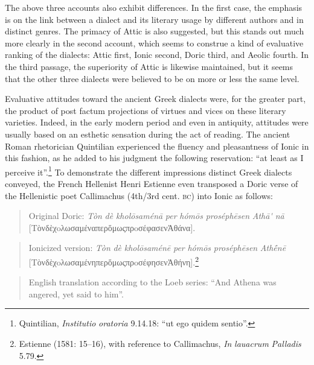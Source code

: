 The above three accounts also exhibit differences. In the first case, the emphasis is on the link between a dialect and its literary usage by different authors and in distinct genres. The primacy of Attic is also suggested, but this stands out much more clearly in the second account, which seems to construe a kind of evaluative ranking of the dialects: Attic first, Ionic second, Doric third, and Aeolic fourth. In the third passage, the superiority of Attic is likewise maintained, but it seems that the other three dialects were believed to be on more or less the same level.

Evaluative attitudes toward the ancient Greek dialects were, for the greater part, the product of post factum projections of virtues and vices on these literary varieties. Indeed, in the early modern period and even in antiquity, attitudes were usually based on an esthetic sensation during the act of reading. The ancient Roman rhetorician Quintilian experienced the fluency and pleasantness of Ionic in this fashion, as he added to his judgment the following reservation: “at least as I perceive it”.\footnote{Quintilian, \textit{Institutio} \textit{oratoria} 9.14.18: “ut ego quidem sentio”.} To demonstrate the different impressions distinct Greek dialects conveyed, the French Hellenist Henri Estienne even transposed a Doric verse of the Hellenistic poet Callimachus (4th/3rd cent. \textsc{bc}) into Ionic as follows:

\begin{quote}
Original Doric: \textit{Tòn} \textit{dè} \textit{kholōsaménā} \textit{per} \textit{hómōs} \textit{proséphēsen} \textit{Athā\'{} nā} [TὸνδὲχoλωσαμέναπερὅμωςπρoσέφασενἈθάνα].
\end{quote}

\begin{quote}
Ionicized version: \textit{Tòn} \textit{dè} \textit{kholōsaménē} \textit{per} \textit{hómōs} \textit{proséphēsen} \textit{Athḗnē} [TὸνδὲχoλωσαμένηπερὅμωςπρoσέφησενἈθήνη].\footnote{Estienne (1581: 15–16), with reference to Callimachus, \textit{In} \textit{lauacrum} \textit{Palladis} 5.79.}
\end{quote}

\begin{quote}
English translation according to the Loeb series: “And Athena was angered, yet said to him”.
\end{quote}

